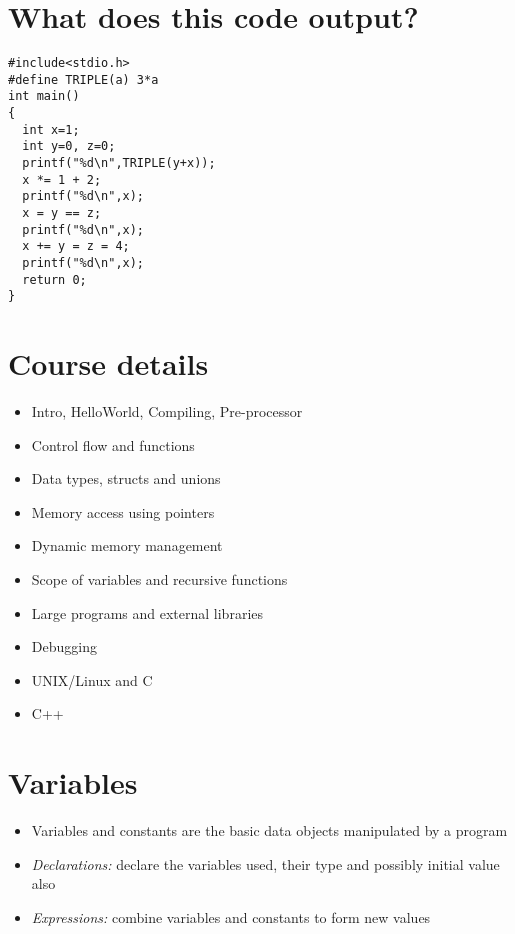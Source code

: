 \documentclass{article}
\begin{document}
\section{What does this code output?}
\begin{verbatim}
#include<stdio.h>
#define TRIPLE(a) 3*a
int main()
{
  int x=1;
  int y=0, z=0;
  printf("%d\n",TRIPLE(y+x));
  x *= 1 + 2;
  printf("%d\n",x);
  x = y == z;
  printf("%d\n",x);
  x += y = z = 4;
  printf("%d\n",x);
  return 0;
}
\end{verbatim}



\section{Course details}
\begin{itemize}
\item Intro, HelloWorld, Compiling, Pre-processor
\item Control flow and functions
\item Data types, structs and unions
\item Memory access using pointers
\item Dynamic memory management
\item Scope of variables and recursive functions
\item Large programs and external libraries
\item Debugging
\item UNIX/Linux and C
\item C++
\end{itemize}



\section{Variables}
\begin{itemize}
\item Variables and constants are the basic data objects manipulated by a program
\item \emph{Declarations:} declare the variables used, their type and possibly initial value also
\item \emph{Expressions:} combine variables and constants to form new values
\end{itemize}
\end{document}

